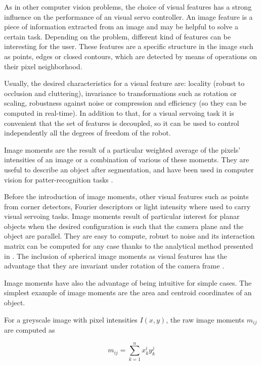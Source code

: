As in other computer vision problems, the choice of visual features has a strong influence on the performance of an visual servo controller. An image feature is a piece of information extracted from an image and may be helpful to solve a certain task. Depending on the problem, different kind of features can be interesting for the user. These features are a specific structure in the image such as points, edges or closed contours, which are detected by means of operations on their pixel neighborhood.

Usually, the desired characteristics \cite{Szeliski2011} for a visual feature are: locality (robust to occlusion and cluttering), invariance to transformations such as rotation or scaling, robustness against noise or compression and efficiency (so they can be computed in real-time). In addition to that, for a visual servoing task it is convenient that the set of features is decoupled, so it can be used to control independently all the degrees of freedom of the robot.

Image moments are the result of a particular weighted average of the pixels' intensities of an image or a combination of various of these moments. They are useful to describe an object after segmentation, and have been used in computer vision for patter-recognition tasks \cite{hu_1962}.

Before the introduction of image moments, other visual features such as points from corner detectors, Fourier descriptors or light intensity where used to carry visual servoing tasks. Image moments result of particular interest for planar objects when the desired configuration is such that the camera plane and the object are parallel. They are easy to compute, robust to noise and its interaction matrix can be computed for any case thanks to the analytical method presented in \cite{chaumette_image_2004}. The inclusion of spherical image moments as visual features has the advantage that they are invariant under rotation of the camera frame \cite{bourquardez_stability_2006}. 

Image moments have also the advantage of being intuitive for simple cases. The simplest example of image moments are the area and centroid coordinates of an object.

For a greyscale image with pixel intensities $I(x, y)$, the raw image moments $m_{ij}$ are computed as

\begin{equation}
m_{ij} = \sum_{k=1}^n x_k^i y_k^j
\end{equation}

